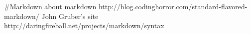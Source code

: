 #Markdown
about markdown
http://blog.codinghorror.com/standard-flavored-markdown/
John Gruber's site
http://daringfireball.net/projects/markdown/syntax
